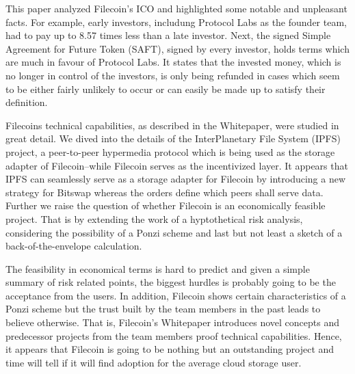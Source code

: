 \documentclass[conference]{IEEEtran}
\begin{document}
This paper analyzed Filecoin's ICO and highlighted some notable and unpleasant facts.
For example, early investors, includung Protocol Labs as the founder team, had to pay up to 8.57 times less than a late investor.
Next, the signed Simple Agreement for Future Token (SAFT), signed by every investor, holds terms which are much in favour of Protocol Labs.
It states that the invested money, which is no longer in control of the investors, is only being refunded in cases which seem to be either fairly unlikely to occur or can easily be made up to satisfy their definition.

Filecoins technical capabilities, as described in the Whitepaper, were studied in great detail.
We dived into the details of the InterPlanetary File System (IPFS) project, a peer-to-peer hypermedia protocol which is being used as the storage adapter of Filecoin--while Filecoin serves as the incentivized layer.
It appears that IPFS can seamlessly serve as a storage adapter for Filecoin by introducing a new strategy for Bitswap whereas the orders define which peers shall serve data.
Further we raise the question of whether Filecoin is an economically feasible project.
That is by extending the work of a hyptothetical risk analysis, considering the possibility of a Ponzi scheme and last but not least a sketch of a back-of-the-envelope calculation.

The feasibility in economical terms is hard to predict and given a simple summary of risk related points, the biggest hurdles is probably going to be the acceptance from the users.
In addition, Filecoin shows certain characteristics of a Ponzi scheme but the trust built by the team members in the past leads to believe otherwise.
That is, Filecoin's Whitepaper introduces novel concepts and predecessor projects from the team members proof technical capabilities.
Hence, it appears that Filecoin is going to be nothing but an outstanding project and time will tell if it will find adoption for the average cloud storage user.

\ifCLASSOPTIONcaptionsoff
  \newpage
\fi

\end{document}
